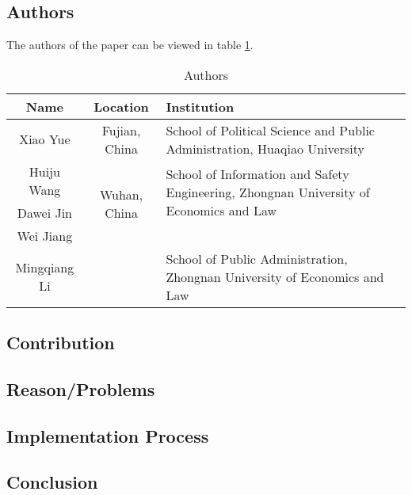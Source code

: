 \clearpage
\section*{\citet{2016_Yue}}

\subsection*{Authors}
The authors of the paper can be viewed in table \ref{tab:2016_Yue_Authors}.
\begin{longtable}{ |c|c|p{5cm}| }
	\caption{Authors} \label{tab:2016_Yue_Authors} \\
	\hline
 	\cellcolor{Gray}Name & \cellcolor{Gray}Location & \cellcolor{Gray}Institution \\ [0.5ex] 
 	\hline\hline
 	\endhead
 	Xiao Yue & Fujian, China   &  School of Political Science and Public Administration, Huaqiao University \\
	\hline
	Huiju Wang & \multirow{3}{*}{ Wuhan, China} & \multirow{2}{*}{{\parbox{5cm}{\centering School of Information and Safety Engineering, Zhongnan University of Economics and Law}}} \\
	 \cline{1-1}
	 Dawei Jin & & \\
	 \cline{1-1}
	 Wei Jiang & & \\
	 \cline{1-1}
	 \cline{3-3} 
	 Mingqiang Li & & School of Public Administration, Zhongnan University of Economics and Law\\
	 \hline
\end{longtable}


\subsection*{Contribution}



\subsection*{Reason/Problems}



\subsection*{Implementation Process}


\subsection*{Conclusion}


